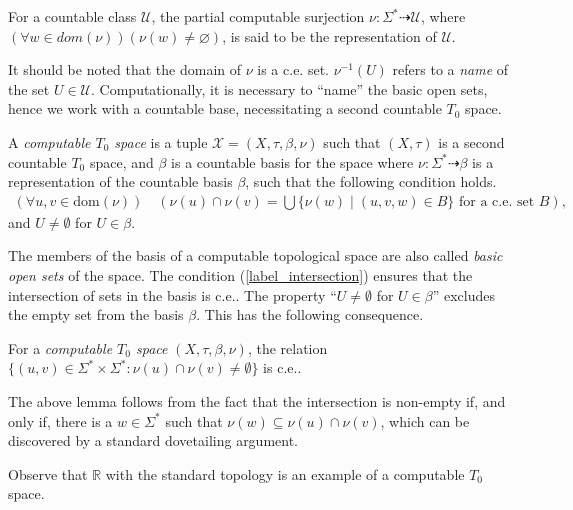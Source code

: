 \documentclass[a4paper,UKenglish,autoref,thm-restate,numberwithinsect]{lipics-v2021}
\newcommand{\X}{\mathcal{X}}
\begin{document}
\begin{definition}
	For a countable class $\mathcal{U}$, the partial computable 	surjection $\nu:\Sigma^*\dashrightarrow\mathcal{U}$, where $(\forall w\in dom(\nu))(\nu(w)\ne\varnothing)$, is said to be the representation of $\mathcal{U}$. 
\end{definition}

It should be noted that the domain of $\nu$ is a c.e. set. $\nu^{-1}(U)$ refers to a \emph{name} of the set $U\in\mathcal{U}$. Computationally, it is necessary to ``name'' the basic open sets, hence we work with a countable base, necessitating a second countable $T_0$ space.

\begin{definition}
	A \emph{computable $T_0$ space} is a tuple $\X=(X,\tau,\beta,\nu)$ such that $(X,\tau)$ is a second countable $T_0$ space, and $\beta$ is a countable basis for the space where $\nu: \Sigma^* \dashrightarrow \beta$ is a representation of the countable basis $\beta$, such that the following condition holds. 
	\begin{align}
		\label{label_intersection}
		\left(\forall u, v \in \text{dom}(\nu)\right)\quad \left(\nu(u)\cap\nu(v) =
		\bigcup \{\nu(w) \mid (u,v,w) \in B\} \text{ for a c.e. set } B\right),
	\end{align}
	and $U \ne \emptyset$ for $U \in \beta$.
\end{definition}

The members of the basis of a computable topological space are also called \textit{basic open sets} of the space. The condition (\ref{label_intersection}) ensures that the intersection of sets in the basis is c.e.. The property ``$U\ne\emptyset$ for $U\in\beta$'' excludes the empty set from the basis $\beta$. This has the following consequence. 

\begin{lemma}
	For a \emph{computable $T_0$ space} $(X,\tau,\beta,\nu)$, the relation $\{(u,v)\in\Sigma^*\times\Sigma^*:\nu(u)\cap\nu(v)\ne\emptyset\}$ is c.e.. 
\end{lemma}

The above lemma follows from the fact that the intersection is non-empty if, and only if, there is a $w\in\Sigma^*$ such that $\nu(w)\subseteq\nu(u)\cap\nu(v)$, which can be discovered by a standard dovetailing argument. 

Observe that $\mathbb{R}$ with the standard topology is an example of a computable $T_0$ space. 
\end{document}
